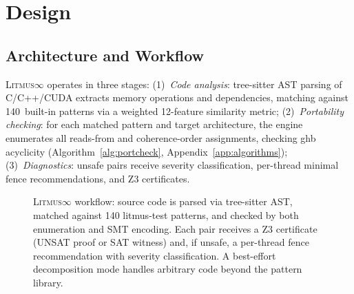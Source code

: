 \documentclass[11pt]{article}
\newcommand{\litmus}{\textsc{Litmus$\infty$}}
\begin{document}
\section{Design}
\label{sec:design}

\subsection{Architecture and Workflow}

\litmus{} operates in three stages:
(1)~\emph{Code analysis}: tree-sitter AST parsing
of C/C++/CUDA extracts memory operations and dependencies,
matching against 140~built-in patterns via a weighted
12-feature similarity metric;
(2)~\emph{Portability checking}: for each matched pattern
and target architecture, the engine enumerates all reads-from
and coherence-order assignments, checking ghb acyclicity
(Algorithm~\ref{alg:portcheck},
Appendix~\ref{app:algorithms});
(3)~\emph{Diagnostics}: unsafe pairs receive severity
classification, per-thread minimal fence recommendations,
and Z3 certificates.

\begin{figure}[ht]
\centering
{}
\caption{\litmus{} workflow: source code is parsed via tree-sitter AST,
matched against 140 litmus-test patterns, and checked by both enumeration
and SMT encoding. Each pair receives a Z3 certificate (UNSAT proof or SAT witness)
and, if unsafe, a per-thread fence recommendation with severity classification.
A best-effort decomposition mode handles arbitrary code beyond the pattern library.}
\label{fig:workflow}
\end{figure}
\end{document}
